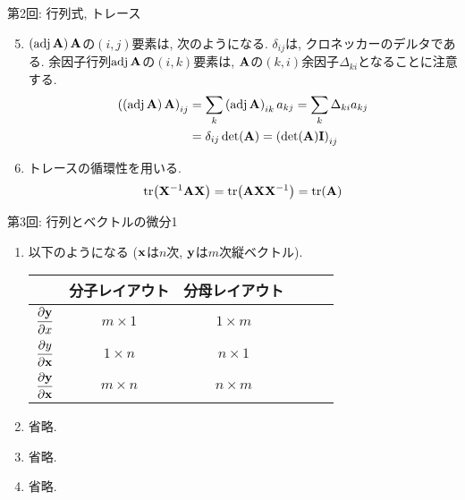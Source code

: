 \documentclass[dvipdfmx,notheorems,t]{beamer}
\begin{document}
\begin{frame}{第2回: 行列式, トレース}
\begin{enumerate}
  \setcounter{enumi}{4}
  \item $\left( \operatorname{adj} \vb{A} \right) \vb{A}$の$(i, j)$要素は, 次のようになる.
  $\delta_{ij}$は, クロネッカーのデルタである.
  余因子行列$\operatorname{adj} \vb{A}$の$(i, k)$要素は, $\vb{A}$の$(k, i)$余因子$\Delta_{ki}$となることに注意する.
  \begin{align*}
    \left( \left( \operatorname{adj} \vb{A} \right) \vb{A} \right)_{ij}
      &= \sum_k \left( \operatorname{adj} \vb{A} \right)_{ik} a_{kj}
      = \sum_k \Delta_{ki} a_{kj} \\
      &= \delta_{ij} \det(\vb{A}) = \left( \det(\vb{A}) \vb{I} \right)_{ij}
  \end{align*}
  \item トレースの循環性を用いる.
  \begin{align*}
    \tr(\vb{X}^{-1} \vb{A} \vb{X}) = \tr(\vb{A} \vb{X} \vb{X}^{-1}) = \tr(\vb{A})
  \end{align*}
\end{enumerate}
\end{frame}

\begin{frame}{第3回: 行列とベクトルの微分1}
\begin{enumerate}
  \item 以下のようになる ($\vb{x}$は$n$次, $\vb{y}$は$m$次縦ベクトル).
  \begin{table}[h]
    \centering
    \begin{tabular}{ScScSc} \hline
      & 分子レイアウト & 分母レイアウト \\ \hline
      $\displaystyle \pdv{\vb{y}}{x}$ & $m \times 1$ & $1 \times m$ \\
      $\displaystyle \pdv{y}{\vb{x}}$ & $1 \times n$ & $n \times 1$ \\
      $\displaystyle \pdv{\vb{y}}{\vb{x}}$ & $m \times n$ & $n \times m$ \\ \hline
    \end{tabular}
  \end{table}

  \item 省略.
  \item 省略.
  \item 省略.
\end{enumerate}
\end{frame}
\end{document}
